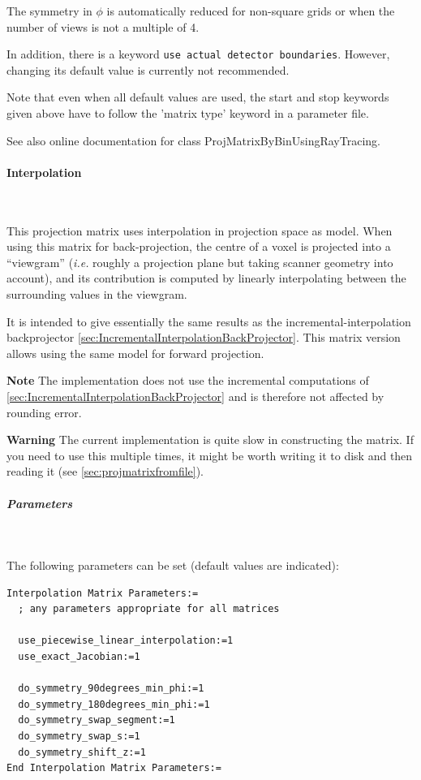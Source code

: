 \documentclass{article}
\newcommand{\subsubsubsection}[1]{\paragraph{#1}\mbox{} \\}
\newcommand{\subsubsubsubsection}[1]{\subparagraph{#1} \mbox{} \\}
\begin{document}
{{The symmetry in $\phi$ is automatically reduced for non-square grids 
or when the number of views is not a multiple of 4.



In addition, there is a keyword \texttt{use actual detector boundaries}. 
However, changing its default value is currently not recommended. 




Note that even when all default values are used, the start and 
stop keywords given above have to follow the 'matrix type' keyword 
in a parameter file.


See also online documentation for class ProjMatrixByBinUsingRayTracing. 


{ \subsubsubsection{Interpolation}
}
\label{sec:projmatrixusinginterpolation}
This projection matrix uses interpolation in projection space as model. 
When using this matrix for back-projection, the centre of a voxel is projected 
into a ``viewgram'' (\textit{i.e.} roughly a projection plane but taking scanner 
geometry into account), and its contribution is computed by linearly interpolating
between the surrounding values in the viewgram.

It is intended to give
essentially the same results as the incremental-interpolation backprojector
\ref{sec:IncrementalInterpolationBackProjector}.
This matrix version allows using the same model for forward projection. 

\textbf{Note} The implementation does not use the incremental computations of 
\ref{sec:IncrementalInterpolationBackProjector} and is therefore not affected 
by rounding error.

\textbf{Warning} The current implementation is quite slow in constructing the matrix.
If you need to use this multiple times, it might be worth writing it to disk and
then reading it (see \ref{sec:projmatrixfromfile}).

{ \subsubsubsubsection{Parameters}
}
The following parameters can be set (default values are indicated):
\begin{verbatim}
Interpolation Matrix Parameters:=
  ; any parameters appropriate for all matrices

  use_piecewise_linear_interpolation:=1
  use_exact_Jacobian:=1

  do_symmetry_90degrees_min_phi:=1
  do_symmetry_180degrees_min_phi:=1
  do_symmetry_swap_segment:=1
  do_symmetry_swap_s:=1
  do_symmetry_shift_z:=1
End Interpolation Matrix Parameters:=
\end{verbatim}

}}
\end{document}
